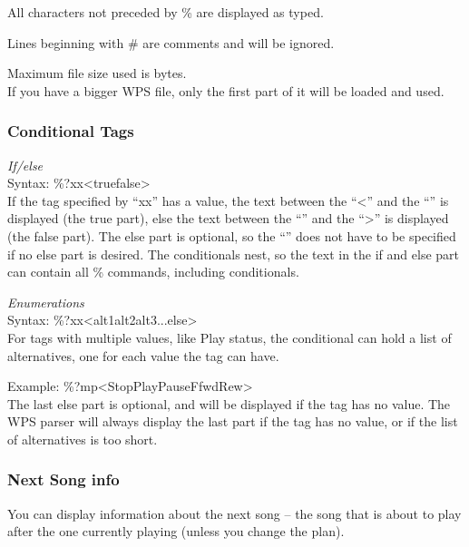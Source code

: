 \begin{description}
  \item All characters not preceded by \% are displayed as typed.
  \item Lines beginning with \# are comments and will be ignored.
  \item Maximum file size used is 
       bytes.\\
      If you have a bigger WPS file, only the first part of it will be 
      loaded and used.
\end{description}

\subsubsection{Conditional Tags}

\emph{If/else}\\

Syntax: \%?xx{\textless}true{\textbar}false{\textgreater}\\

If the tag specified by ``xx'' has a value, the text between the ``{\textless}'' and the ``{\textbar}'' is displayed (the true part), else the text between the ``{\textbar}'' and the ``{\textgreater}'' is displayed (the false part).
The else part is optional, so the ``{\textbar}'' does not have to be specified if no else part is desired. The conditionals nest, so the text in the if and else part can contain all \% commands, including conditionals.

\emph{Enumerations}\\

Syntax: \%?xx{\textless}alt1{\textbar}alt2{\textbar}alt3{\textbar}...{\textbar}else{\textgreater}\\

For tags with multiple values, like Play status, the conditional can hold a list of alternatives, one for each value the tag can have.

Example: \%?mp{\textless}Stop{\textbar}Play{\textbar}Pause{\textbar}Ffwd{\textbar}Rew{\textgreater}\\

The last else part is optional, and will be displayed if the tag has no value. The WPS parser will always display the last part if the tag has no value, or if the list of alternatives is too short. 

\subsubsection{Next Song info}
You can display information about the next song -- the song that is
about to play after the one currently playing (unless you change the
plan).

